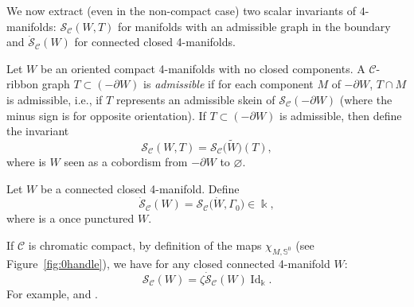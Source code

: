 \documentclass[pdftex]{sigma}
\numberwithin{equation}{section}
\numberwithin{theorem}{section}
\numberwithin{proposition}{section}
\numberwithin{definition}{section}
\numberwithin{lemma}{section}
\numberwithin{corollary}{section}
\numberwithin{remark}{section}
\numberwithin{example}{section}
\newcommand{\cat}{\mathcal{C}}
\newcommand{\Id}{\operatorname{Id}}
\newcommand{\FK}{{\Bbbk}}
\newcommand{\wt}{\widetilde}
\newcommand{\TSkein}{{\mathscr{S}}}
\newcommand{\Sp}{\mathbb{S}}
\begin{document}
We now extract (even in the non-compact case) two scalar invariants of
$4$-manifolds: $\TSkein_\cat(W,T)$ for manifolds with an admissible
graph in the boundary and $\dot\TSkein_\cat(W)$ for connected closed
4-manifolds.
\begin{definition}
 Let $W$ be an oriented compact 4-manifolds with no closed components.
 A $\cat$-ribbon graph $T\subset(-\partial W)$ is \emph{admissible} if for each
 component $M$ of $-\partial W$, $T\cap M$ is admissible, i.e., if $T$
 represents an admissible skein of $\TSkein_\cat(-\partial W)$ (where
 the minus sign is for opposite orientation).
 If $T\subset(-\partial W)$ is admissible, then
 define the invariant
 \[\TSkein_\cat(W,T)=\TSkein_\cat\bigl(\wt W\bigr)(T),\]
 where \smash{$\wt W$} is $W$ seen
 as a cobordism from $-\partial W$ to
 $\varnothing$.
\end{definition}
\begin{definition}
 Let $W$ be a
 connected closed 4-manifold.
 Define
 \[
 \dot\TSkein_\cat(W)=\TSkein_\cat\bigl(\dot W,\Gamma_0\bigr)\in\FK,
 \]
 where
  is a once punctured $W$.
\end{definition}
If
$\cat$ is chromatic compact, by definition of the maps $\chi_{M,\Sp^0}$ (see Figure~\ref{fig:0handle}), we
have for any closed connected 4-manifold $W$:
\begin{equation*}
 \TSkein_\cat(W)=\zeta\dot\TSkein_\cat(W)\Id_\FK.
\end{equation*}
For example, \smash{$\dot\TSkein_\cat\bigl(S^4\bigr)=1$} and \smash{$\TSkein_\cat\bigl(S^4\bigr)=\zeta\Id_\FK$}.
\end{document}
